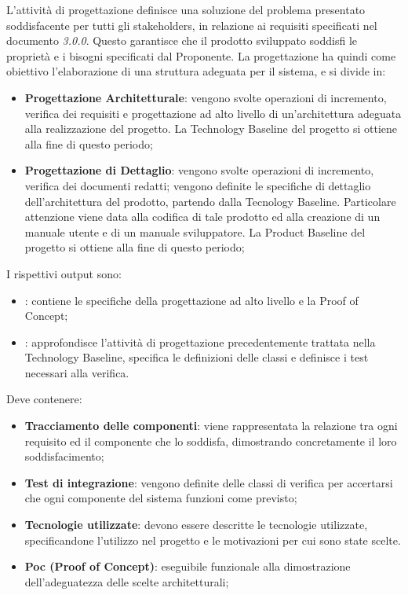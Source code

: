         L'attività di progettazione definisce una soluzione del problema presentato soddisfacente per tutti gli stakeholders, in relazione ai requisiti specificati nel documento \AdR{} \textit{3.0.0}. Questo garantisce che il prodotto sviluppato soddisfi le proprietà e i bisogni specificati dal Proponente.
        La progettazione ha quindi come obiettivo l'elaborazione di una struttura adeguata per il sistema, e si divide in:
        \begin{itemize}
        	\item{\textbf{Progettazione Architetturale}}: vengono svolte operazioni di incremento, verifica dei requisiti e progettazione ad alto livello di un'architettura adeguata alla realizzazione del progetto. La Technology Baseline del progetto si ottiene alla fine di questo periodo;
        	\item{\textbf{Progettazione di Dettaglio}}: vengono svolte operazioni di incremento, verifica dei documenti redatti; vengono definite le specifiche di dettaglio dell'architettura del prodotto, partendo dalla Tecnology Baseline. Particolare attenzione viene data alla codifica di tale prodotto ed alla creazione di un manuale utente e di un manuale sviluppatore. La Product Baseline del progetto si ottiene alla fine di questo periodo;
        \end{itemize}
    	I rispettivi output sono:
        \begin{itemize}
           	\item{\textbf{\TB{}}: contiene le specifiche della progettazione ad alto livello e la Proof of Concept;}
			\item{\textbf{\PB{}}: approfondisce l'attività di progettazione precedentemente trattata nella Technology Baseline, specifica le definizioni delle classi e definisce i test necessari alla verifica.}
   		\end{itemize}

  Deve contenere:
  \begin{itemize}
		\item \textbf{Tracciamento delle componenti}: viene rappresentata la relazione tra ogni requisito ed il componente che lo soddisfa, dimostrando concretamente il loro soddisfacimento;
		\item \textbf{Test di integrazione}: vengono definite delle classi di verifica per accertarsi che ogni componente del sistema funzioni come previsto;
		\item \textbf{Tecnologie utilizzate}: devono essere descritte le tecnologie utilizzate, specificandone l'utilizzo nel progetto e le motivazioni per cui sono state scelte.
		\item \textbf{Poc (Proof of Concept)}: eseguibile funzionale alla dimostrazione dell'adeguatezza delle scelte architetturali;
  \end{itemize}

